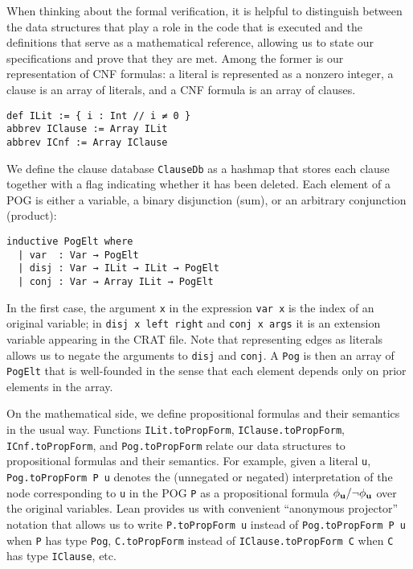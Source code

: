 When thinking about the formal verification, it is helpful to distinguish between
the data structures that play a role in the code that is
executed and the definitions that serve as a mathematical reference,
allowing us to state our specifications and prove that they are met.
Among the former is our representation of CNF formulas:
a literal is represented as a nonzero integer, a clause is an array of literals,
and a CNF formula is an array of clauses.
\begin{lstlisting}
def ILit := { i : Int // i ≠ 0 }
abbrev IClause := Array ILit
abbrev ICnf := Array IClause
\end{lstlisting}
We define the clause database {\tt ClauseDb} as a hashmap that
stores each clause together with a flag indicating whether it has
been deleted.
Each element of a POG is either a variable, a binary disjunction (sum),
or an arbitrary conjunction (product):
\begin{lstlisting}
inductive PogElt where
  | var  : Var → PogElt
  | disj : Var → ILit → ILit → PogElt
  | conj : Var → Array ILit → PogElt
\end{lstlisting}
In the first case, the argument \lstinline{x} in the expression
\lstinline{var x} is the index
of an original variable; in \lstinline{disj x left right} and \lstinline{conj x args}
it is an extension variable appearing in the CRAT file. Note that representing edges as literals
allows us to negate the arguments to \lstinline{disj} and \lstinline{conj}.
A \lstinline{Pog} is then an array of \lstinline{PogElt}
that is well-founded in the sense that each element depends only on prior elements
in the array.

On the mathematical side, we define propositional formulas and
their semantics in the usual way.
Functions \lstinline{ILit.toPropForm}, \lstinline{IClause.toPropForm},
\lstinline{ICnf.toPropForm}, and \lstinline{Pog.toPropForm}
relate our data structures to propositional formulas and their semantics.
For example, given a literal \lstinline{u}, \lstinline{Pog.toPropForm P u}
denotes the (unnegated or negated) interpretation of the node corresponding to \lstinline{u} in the POG
\lstinline{P} as a propositional formula $\phi_{\mathbf{u}}/\neg\phi_{\mathbf{u}}$ over the
original variables.
Lean provides us with convenient ``anonymous projector'' notation that allows
us to write \lstinline{P.toPropForm u} instead of \lstinline{Pog.toPropForm P u}
when \lstinline{P} has type \lstinline{Pog},
\lstinline{C.toPropForm} instead of \lstinline{IClause.toPropForm C} when \lstinline{C}
has type \lstinline{IClause}, etc.

